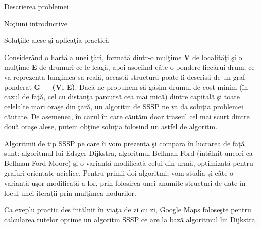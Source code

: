 \documentclass[a4paper]{article}
\begin{document}
\begin{section}{Descrierea problemei}
\begin{subsection}{No\c tiuni introductive\\}
\end{subsection}


\begin{subsection}{Solu\c tiile alese \c si aplica\c tia practic\u a\\}

	Consider\^ and o hart\u a a unei \c t\u ari, format\u a dintr-o mul\c time \textbf{V} de localit\u a\c ti \c si o mul\c time \textbf{E} de drumuri ce le leag\u a, apoi asociind c\^ ate o pondere fiec\u arui drum, ce va reprezenta lungimea sa real\u a, aceast\u a structur\u a poate fi descris\u a de un graf ponderat \textbf{G = (V, E)}.  Dac\u a ne propunem s\u a g\u asim drumul de cost minim (\^ in cazul de fa\c t\u a, cel cu distan\c ta parcurs\u a cea mai mic\u a) dintre capital\u a \c si toate celelalte mari ora\c se din \c tar\u a, un algoritm de SSSP ne va da solu\c tia problemei c\u autate.  De asemenea, \^ in cazul \^in care c\u aut\u am doar traseul cel mai scurt dintre dou\u a ora\c se alese, putem ob\c tine solu\c tia folosind un astfel de algoritm. \par
	Algoritmii de tip SSSP pe care \^ ii vom prezenta \c si compara \^ in lucrarea de fa\c t\u a sunt: algoritmul lui Edsger Dijkstra, algoritmul Bellman-Ford (\^ int\^ alnit uneori ca Bellman-Ford-Moore) \c si o variant\u a modificat\u a celui din urm\u a, optimizat\u a pentru grafuri orientate aciclice. Pentru primii doi algoritmi, vom studia \c si c\^ ate o variant\u a u\c sor modificat\u a a lor, prin folosirea unei anumite structuri de date \^ in locul unei itera\c tii prin mul\c timea nodurilor. \par
	Ca exeplu practic des \^ int\^ alnit \^ in via\c ta de zi cu zi, Google Maps folose\c ste pentru calcularea rutelor optime un algoritm SSSP ce are la baz\u a algoritmul lui Dijkstra. \\[1cm]

\end{subsection}



\end{section}
\end{document}
